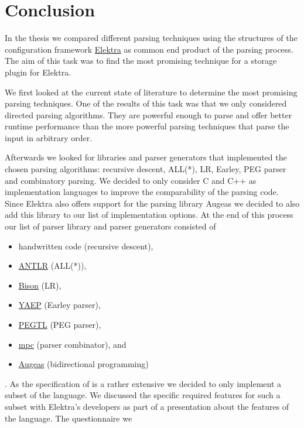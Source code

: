 \chapter{Conclusion}

In the thesis we compared different parsing techniques using the  structures of the configuration framework \href{https://www.libelektra.org}{Elektra} as common end product of the parsing process. The aim of this task was to find the most promising technique for a  storage plugin for Elektra.

We first looked at the current state of literature to determine the most promising parsing techniques. One of the results of this task was that we only considered directed parsing algorithms. They are powerful enough to parse  and offer better runtime performance than the more powerful parsing techniques that parse the input in arbitrary order.

Afterwards we looked for libraries and parser generators that implemented the chosen parsing algorithms: recursive descent, \gls{ALL(*)}, LR, Earley, \gls{PEG} parser and combinatory parsing. We decided to only consider C and C++ as implementation languages to improve the comparability of the parsing code. Since Elektra also offers support for the parsing library Augeas we decided to also add this library to our list of implementation options. At the end of this process our list of parser library and parser generators consisted of

\begin{itemize}
  \item handwritten code (recursive descent),
  \item \href{http://www.antlr.org}{ANTLR} (\gls{ALL(*)}),
  \item \href{https://www.gnu.org/software/bison}{Bison} (LR),
  \item \href{https://github.com/vnmakarov/yaep}{YAEP} (Earley parser),
  \item \href{https://github.com/taocpp/PEGTL}{PEGTL} (PEG parser),
  \item \href{https://github.com/orangeduck/mpc}{mpc} (parser combinator), and
  \item \href{http://augeas.net}{Augeas} (bidirectional programming)
\end{itemize}

. As the specification of  is a rather extensive we decided to only implement a subset of the language. We discussed the specific required features for such a subset with Elektra’s developers as part of a presentation about the features of the language. The questionnaire we

